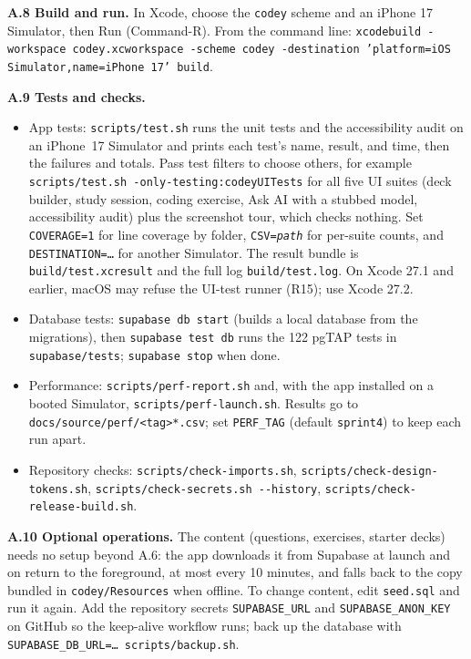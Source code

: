 \documentclass[12pt,letterpaper]{article}
\begin{document}
\textbf{A.8 Build and run.} In Xcode, choose the \texttt{codey} scheme and an iPhone 17
Simulator, then Run (Command-R). From the command line:
\texttt{xcodebuild -workspace codey.xcworkspace -scheme codey -destination
'platform=iOS Simulator,name=iPhone 17' build}.

\textbf{A.9 Tests and checks.}
\begin{itemize}
  \item App tests: \texttt{scripts/test.sh} runs the unit tests and the accessibility
        audit on an iPhone~17 Simulator and prints each test's name, result, and time,
        then the failures and totals. Pass test filters to choose others, for example
        \texttt{scripts/test.sh -only-testing:codeyUITests} for all five UI suites (deck
        builder, study session, coding exercise, Ask AI with a stubbed model,
        accessibility audit) plus the screenshot tour, which checks nothing. Set
        \texttt{COVERAGE=1} for line coverage by folder, \texttt{CSV=\textit{path}} for
        per-suite counts, and \texttt{DESTINATION=\ldots} for another Simulator. The
        result bundle is \texttt{build/test.xcresult} and the full log
        \texttt{build/test.log}. On Xcode 27.1 and earlier, macOS may refuse the
        UI-test runner (R15); use Xcode 27.2.
  \item Database tests: \texttt{supabase db start} (builds a local database from the
        migrations), then \texttt{supabase test db} runs the 122 pgTAP tests in
        \texttt{supabase/tests}; \texttt{supabase stop} when done.
  \item Performance: \texttt{scripts/perf-report.sh} and, with the app installed on a
        booted Simulator, \texttt{scripts/perf-launch.sh}. Results go to
        \texttt{docs/source/perf/<tag>*.csv}; set \texttt{PERF\_TAG} (default
        \texttt{sprint4}) to keep each run apart.
  \item Repository checks: \texttt{scripts/check-imports.sh},
        \texttt{scripts/check-design-tokens.sh},
        \texttt{scripts/check-secrets.sh -{}-history},
        \texttt{scripts/check-release-build.sh}.
\end{itemize}

\textbf{A.10 Optional operations.} The content (questions, exercises, starter decks)
needs no setup beyond A.6: the app downloads it from Supabase at launch and on return
to the foreground, at most every 10 minutes, and falls back to the copy bundled in
\texttt{codey/Resources} when offline. To change content, edit \texttt{seed.sql} and
run it again. Add the repository secrets \texttt{SUPABASE\_URL}
and \texttt{SUPABASE\_ANON\_KEY} on GitHub so the keep-alive workflow runs; back up
the database with \texttt{SUPABASE\_DB\_URL=\ldots{} scripts/backup.sh}.
\end{document}
